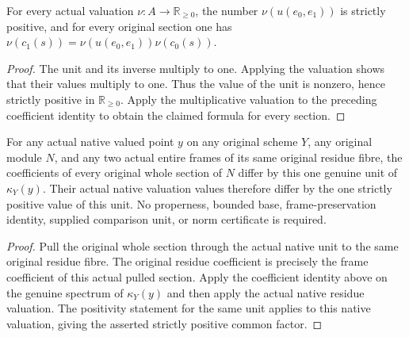 \begin{lemma}\label{lem:fc-original-frame-transition-positive-value}
\leanok
{}
For every actual valuation $\nu:A\to\mathbb R_{\geq0}$, the number
$\nu(u(e_0,e_1))$ is strictly positive, and for every original
section one has
$\nu(c_1(s))=\nu(u(e_0,e_1))\nu(c_0(s))$.
\end{lemma}
\begin{proof}
The unit and its inverse multiply to one. Applying the valuation
shows that their values multiply to one. Thus the value of the
unit is nonzero, hence strictly positive in $\mathbb R_{\geq0}$.
Apply the multiplicative valuation to the preceding coefficient
identity to obtain the claimed formula for every section.
\end{proof}

\begin{corollary}\label{cor:fc-native-residue-frame-transition}
\leanok
{}
For any actual native valued point $y$ on any original scheme $Y$,
any original module $N$, and any two actual entire frames of its
same original residue fibre, the coefficients of every original
whole section of $N$ differ by this one genuine unit of
$\kappa_Y(y)$. Their actual native valuation values therefore
differ by the one strictly positive value of this unit. No
properness, bounded base, frame-preservation identity, supplied
comparison unit, or norm certificate is required.
\end{corollary}
\begin{proof}
Pull the original whole section through the actual native unit to
the same original residue fibre. The original residue coefficient
is precisely the frame coefficient of this actual pulled section.
Apply the coefficient identity above on the genuine spectrum of
$\kappa_Y(y)$ and then apply the actual native residue valuation.
The positivity statement for the same unit applies to this native
valuation, giving the asserted strictly positive common factor.
\end{proof}

